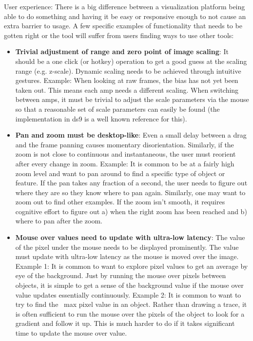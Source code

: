 User experience:
There is a big difference between a visualization platform being able to do something and having it be easy or responsive enough to not cause an extra barrier to usage.  A few specific examples of functionality that needs to be gotten right or the tool will suffer from users finding ways to use other tools:
\begin{itemize}

\item \textbf{Trivial adjustment of range and zero point of image scaling}:
It should be a one click (or hotkey) operation to get a good guess at the scaling range (e.g. z-scale).
Dynamic scaling needs to be achieved through intuitive gestures.
Example: When looking at raw frames, the bias has not yet been taken out.  This means each amp needs a different scaling.  When switching between amps, it must be trivial to adjust the scale parameters via the mouse so that a reasonable set of scale parameters can easily be found (the implementation in ds9 is a well known reference for this).
\item \textbf{Pan and zoom must be desktop-like}:
Even a small delay between a drag and the frame panning causes momentary disorientation.
Similarly, if the zoom is not close to continuous and instantaneous, the user must reorient after every change in zoom.
Example: It is common to be at a fairly high zoom level and want to pan around to find a specific type of object or feature.  If the pan takes any fraction of a second, the user needs to figure out where they are so they know where to pan again.  Similarly, one may want to zoom out to find other examples.  If the zoom isn't smooth, it requires cognitive effort to figure out a) when the right zoom has been reached and b) where to pan after the zoom.
\item \textbf{Mouse over values need to update with ultra-low latency}:
The value of the pixel under the mouse needs to be displayed prominently.
The value must update with ultra-low latency as the mouse is moved over the image.
Example 1: It is common to want to explore pixel values to get an average by eye of the background.  Just by running the mouse over pixels between objects, it is simple to get a sense of the background value if the mouse over value updates essentially continuously.
Example 2: It is common to want to try to find the ~max pixel value in an object.  Rather than drawing a trace, it is often sufficient to run the mouse over the pixels of the object to look for a gradient and follow it up.  This is much harder to do if it takes significant time to update the mouse over value.

\end{itemize}
